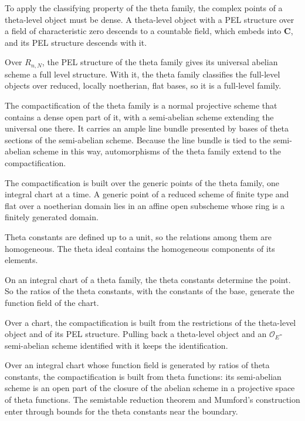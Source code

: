 To apply the classifying property of the theta family, the complex points of a theta-level object must
be dense. A theta-level object with a PEL structure over a field of characteristic zero descends to a
countable field, which embeds into $\mathbf C$, and its PEL structure descends with it.

Over $R_{n,N}$, the PEL structure of the theta family gives its universal abelian scheme a full level
structure. With it, the theta family classifies the full-level objects over reduced, locally
noetherian, flat bases, so it is a full-level family.

The compactification of the theta family is a normal projective scheme that contains a dense open part
of it, with a semi-abelian scheme extending the universal one there. It carries an ample line bundle
presented by bases of theta sections of the semi-abelian scheme. Because the line bundle is tied to
the semi-abelian scheme in this way, automorphisms of the theta family extend to the compactification.

The compactification is built over the generic points of the theta family, one integral chart at a
time. A generic point of a reduced scheme of finite type and flat over a noetherian domain lies in an
affine open subscheme whose ring is a finitely generated domain.

Theta constants are defined up to a unit, so the relations among them are homogeneous. The theta ideal
contains the homogeneous components of its elements.

On an integral chart of a theta family, the theta constants determine the point. So the ratios of the
theta constants, with the constants of the base, generate the function field of the chart.

Over a chart, the compactification is built from the restrictions of the theta-level object and of its
PEL structure. Pulling back a theta-level object and an $\mathcal O_E$-semi-abelian scheme identified with
it keeps the identification.

Over an integral chart whose function field is generated by ratios of theta constants, the
compactification is built from theta functions: its semi-abelian scheme is an open part of the closure of
the abelian scheme in a projective space of theta functions. The semistable reduction theorem and
Mumford's construction enter through bounds for the theta constants near the boundary.


